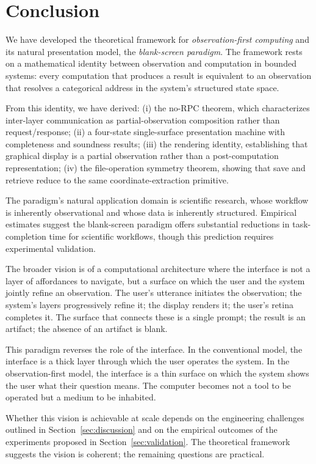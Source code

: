\documentclass[11pt,a4paper]{article}
\theoremstyle{definition}
\theoremstyle{remark}
\begin{document}
\section{Conclusion}
\label{sec:conclusion}

We have developed the theoretical framework for \emph{observation-first computing} and its natural presentation model, the \emph{blank-screen paradigm}. The framework rests on a mathematical identity between observation and computation in bounded systems: every computation that produces a result is equivalent to an observation that resolves a categorical address in the system's structured state space.

From this identity, we have derived: (i) the no-RPC theorem, which characterizes inter-layer communication as partial-observation composition rather than request/response; (ii) a four-state single-surface presentation machine with completeness and soundness results; (iii) the rendering identity, establishing that graphical display is a partial observation rather than a post-computation representation; (iv) the file-operation symmetry theorem, showing that save and retrieve reduce to the same coordinate-extraction primitive.

The paradigm's natural application domain is scientific research, whose workflow is inherently observational and whose data is inherently structured. Empirical estimates suggest the blank-screen paradigm offers substantial reductions in task-completion time for scientific workflows, though this prediction requires experimental validation.

The broader vision is of a computational architecture where the interface is not a layer of affordances to navigate, but a surface on which the user and the system jointly refine an observation. The user's utterance initiates the observation; the system's layers progressively refine it; the display renders it; the user's retina completes it. The surface that connects these is a single prompt; the result is an artifact; the absence of an artifact is blank.

This paradigm reverses the role of the interface. In the conventional model, the interface is a thick layer through which the user operates the system. In the observation-first model, the interface is a thin surface on which the system shows the user what their question means. The computer becomes not a tool to be operated but a medium to be inhabited.

Whether this vision is achievable at scale depends on the engineering challenges outlined in Section~\ref{sec:discussion} and on the empirical outcomes of the experiments proposed in Section~\ref{sec:validation}. The theoretical framework suggests the vision is coherent; the remaining questions are practical.



\end{document}
